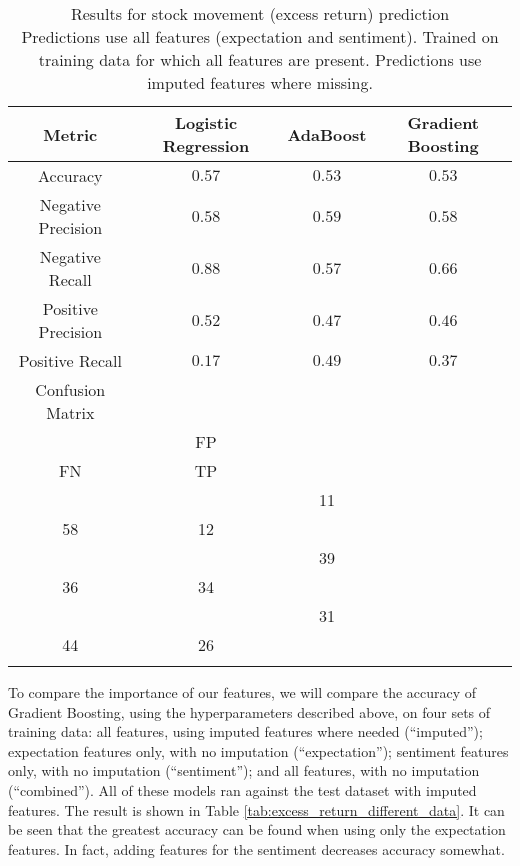 \documentclass{article}
\begin{document}
\begin{table}[h]
\centering
\begin{tabular}{|c|c|c|c|}
\hline
\textbf{Metric} & \textbf{Logistic Regression} & \textbf{AdaBoost} & \textbf{Gradient Boosting} \\
\hline
Accuracy & $0.57$ & $0.53$ & $0.53$ \\
\hline
Negative Precision & $0.58$ & $0.59$ & $0.58$ \\
\hline
Negative Recall & $0.88$ & $0.57$ & $0.66$ \\
\hline
Positive Precision & $0.52$ & $0.47$ & $0.46$ \\
\hline
Positive Recall & $0.17$ & $0.49$ & $0.37$ \\
\hline
Confusion Matrix \\
\(
\begin{bmatrix}
TN & FP \\
FN & TP \\
\end{bmatrix}
\)
&
\(
\begin{bmatrix}
80 & 11 \\
58 & 12 \\
\end{bmatrix}
\)
&
\(
\begin{bmatrix}
52 & 39 \\
36 & 34 \\
\end{bmatrix}
\)
&
\(
\begin{bmatrix}
60 & 31 \\
44 & 26 \\
\end{bmatrix}
\)
\\
\end{tabular}
\caption{Results for stock movement (excess return) prediction\\
Predictions use all features (expectation and sentiment). Trained on training data for which all features are present. Predictions use imputed features where missing.}
\label{tab:excess_return_prediction}
\end{table}

To compare the importance of our features, we will compare the accuracy of Gradient Boosting, using the hyperparameters described above, on four sets of training data:
all features, using imputed features where needed (``imputed'');
expectation features only, with no imputation (``expectation'');
sentiment features only, with no imputation (``sentiment'');
and all features, with no imputation (``combined'').
All of these models ran against the test dataset with imputed features.
The result is shown in Table \ref{tab:excess_return_different_data}.
It can be seen that the greatest accuracy can be found when using only the expectation features.
In fact, adding features for the sentiment decreases accuracy somewhat.
\end{document}
